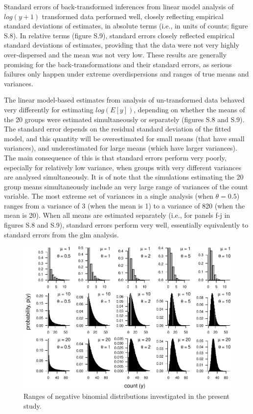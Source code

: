 \documentclass[]{article}
\begin{document}
Standard errors of back-transformed inferences from linear model
analysis of \(log(y+1)\) transformed data performed well, closely
reflecting empirical standard deviations of estimates, in absolute terms
(i.e., in units of counts; figure S.8). In relative terms (figure S.9),
standard errors closely reflected empirical standard deviations of
estimates, providing that the data were not very highly over-dispersed
and the mean was not very low. These results are generally promising for
the back-transformations and their standard errors, as serious failures
only happen under extreme overdispersions and ranges of true means and
variances.

The linear model-based estimates from analysis of un-transformed data
behaved very differently for estimating \(log(E[y])\), depending on
whether the means of the 20 groups were estimated simultaneously or
separately (figures S.8 and S.9). The standard error depends on the
residual standard deviation of the fitted model, and this quantity will
be overestimated for small means (that have small variances), and
underestimated for large means (which have larger variances). The main
consequence of this is that standard errors perform very poorly,
especially for relatively low variance, when groups with very different
variances are analysed simultaneously. It is of note that the
simulations estimating the 20 group means simultaneously include an very
large range of variances of the count variable. The most extreme set of
variances in a single analysis (when \(\theta = 0.5\)) ranges from a
variance of 3 (when the mean is 1) to a variance of 820 (when the mean
is 20). When all means are estimated separately (i.e., for panels f-j in
figures S.8 and S.9), standard errors perform very well, essentially
equivalently to standard errors from the glm analysis.

\clearpage

\begin{figure}
\centering
\includegraphics{revisiting_count_data_advice_files/figure-latex/negativeBinomialExamples-1.pdf}
\caption{Ranges of negative binomial distributions investigated in the
present study.}
\end{figure}
\end{document}
